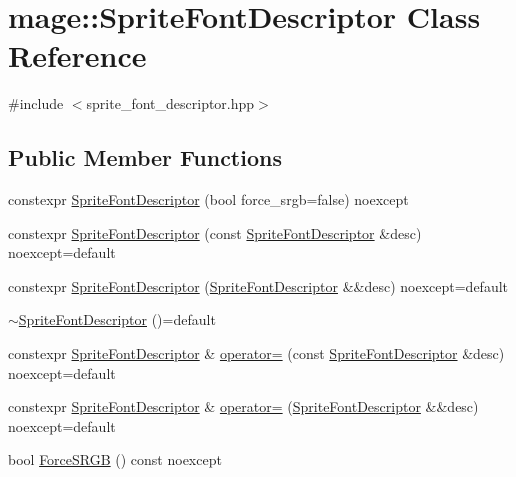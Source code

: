 \hypertarget{classmage_1_1_sprite_font_descriptor}{}\section{mage\+:\+:Sprite\+Font\+Descriptor Class Reference}
\label{classmage_1_1_sprite_font_descriptor}


{\ttfamily \#include $<$sprite\+\_\+font\+\_\+descriptor.\+hpp$>$}

\subsection*{Public Member Functions}
\begin{DoxyCompactItemize}
\item 
constexpr \hyperlink{classmage_1_1_sprite_font_descriptor_a8b7a15c8bd816ee3a5ca01ccba22f9d6}{Sprite\+Font\+Descriptor} (bool force\+\_\+srgb=false) noexcept
\item 
constexpr \hyperlink{classmage_1_1_sprite_font_descriptor_a50e10711f71e443afa80c23b018b084a}{Sprite\+Font\+Descriptor} (const \hyperlink{classmage_1_1_sprite_font_descriptor}{Sprite\+Font\+Descriptor} \&desc) noexcept=default
\item 
constexpr \hyperlink{classmage_1_1_sprite_font_descriptor_ac5dbe0eda36dbb031aed0d12af875ab1}{Sprite\+Font\+Descriptor} (\hyperlink{classmage_1_1_sprite_font_descriptor}{Sprite\+Font\+Descriptor} \&\&desc) noexcept=default
\item 
\hyperlink{classmage_1_1_sprite_font_descriptor_ab259871eed5ca9be3830d7da9cfc7092}{$\sim$\+Sprite\+Font\+Descriptor} ()=default
\item 
constexpr \hyperlink{classmage_1_1_sprite_font_descriptor}{Sprite\+Font\+Descriptor} \& \hyperlink{classmage_1_1_sprite_font_descriptor_ae5990d08d21ca2d60d3cdc46508817c7}{operator=} (const \hyperlink{classmage_1_1_sprite_font_descriptor}{Sprite\+Font\+Descriptor} \&desc) noexcept=default
\item 
constexpr \hyperlink{classmage_1_1_sprite_font_descriptor}{Sprite\+Font\+Descriptor} \& \hyperlink{classmage_1_1_sprite_font_descriptor_a2db76dba5839327af54faeda0cd91d27}{operator=} (\hyperlink{classmage_1_1_sprite_font_descriptor}{Sprite\+Font\+Descriptor} \&\&desc) noexcept=default
\item 
bool \hyperlink{classmage_1_1_sprite_font_descriptor_a6124a9d8323768b970033eef43d0be6f}{Force\+S\+R\+GB} () const noexcept
\end{DoxyCompactItemize}
